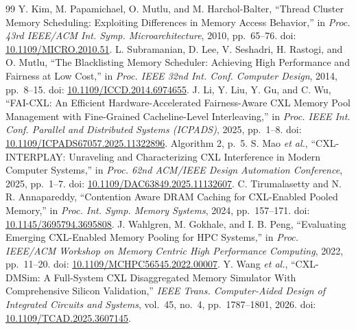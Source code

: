 \documentclass[10pt,letterpaper,twocolumn]{article}
\begin{document}
\begin{thebibliography}{99}
 Y. Kim, M. Papamichael, O. Mutlu, and M. Harchol-Balter, ``Thread Cluster Memory Scheduling: Exploiting Differences in Memory Access Behavior,'' in \emph{Proc. 43rd IEEE/ACM Int. Symp. Microarchitecture}, 2010, pp.~65--76. doi: \href{https://doi.org/10.1109/MICRO.2010.51}{10.1109/MICRO.2010.51}.
 L. Subramanian, D. Lee, V. Seshadri, H. Rastogi, and O. Mutlu, ``The Blacklisting Memory Scheduler: Achieving High Performance and Fairness at Low Cost,'' in \emph{Proc. IEEE 32nd Int. Conf. Computer Design}, 2014, pp.~8--15. doi: \href{https://doi.org/10.1109/ICCD.2014.6974655}{10.1109/ICCD.2014.6974655}.
 J. Li, Y. Liu, Y. Gu, and C. Wu, ``FAI-CXL: An Efficient Hardware-Accelerated Fairness-Aware CXL Memory Pool Management with Fine-Grained Cacheline-Level Interleaving,'' in \emph{Proc. IEEE Int. Conf. Parallel and Distributed Systems (ICPADS)}, 2025, pp.~1--8. doi: \href{https://doi.org/10.1109/ICPADS67057.2025.11322896}{10.1109/ICPADS67057.2025.11322896}. Algorithm 2, p.~5.
 S. Mao \emph{et al.}, ``CXL-INTERPLAY: Unraveling and Characterizing CXL Interference in Modern Computer Systems,'' in \emph{Proc. 62nd ACM/IEEE Design Automation Conference}, 2025, pp.~1--7. doi: \href{https://doi.org/10.1109/DAC63849.2025.11132607}{10.1109/DAC63849.2025.11132607}.
 C. Tirumalasetty and N. R. Annapareddy, ``Contention Aware DRAM Caching for CXL-Enabled Pooled Memory,'' in \emph{Proc. Int. Symp. Memory Systems}, 2024, pp.~157--171. doi: \href{https://doi.org/10.1145/3695794.3695808}{10.1145/3695794.3695808}.
 J. Wahlgren, M. Gokhale, and I. B. Peng, ``Evaluating Emerging CXL-Enabled Memory Pooling for HPC Systems,'' in \emph{Proc. IEEE/ACM Workshop on Memory Centric High Performance Computing}, 2022, pp.~11--20. doi: \href{https://doi.org/10.1109/MCHPC56545.2022.00007}{10.1109/MCHPC56545.2022.00007}.
 Y. Wang \emph{et al.}, ``CXL-DMSim: A Full-System CXL Disaggregated Memory Simulator With Comprehensive Silicon Validation,'' \emph{IEEE Trans. Computer-Aided Design of Integrated Circuits and Systems}, vol.~45, no.~4, pp.~1787--1801, 2026. doi: \href{https://doi.org/10.1109/TCAD.2025.3607145}{10.1109/TCAD.2025.3607145}.




\end{thebibliography}
\end{document}
